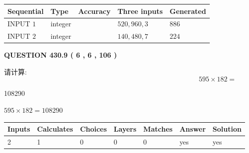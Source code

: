 \documentclass{ctexart}
\begin{document}
   
  
  
\noindent\begin{tabular}{|l|l|l|l|l|}
\hline
 Sequential & Type & Accuracy & Three inputs & Generated \\ 
\hline
 
 
  INPUT $  1 $ & integer &  & $
 520
 , 
 960
 , 
 3
 $ & $ 886 $ 
 \\  \hline  
 
 
  INPUT $  2 $ & integer &  & $
 140
 , 
 480
 , 
 7
 $ & $ 224 $ 
 \\  \hline  
 \end{tabular}
   
   
  
\vspace{0.2in}
  
{\textbf{\Large{QUESTION
430.9 
 ( 6 , 6 , 106 )
}}}
  
  
 
请计算:
\begin{equation}
595  \times    %
182 = \nonumber
\end{equation}
 
 
 
\noindent{}
 
 

108290
 
 
\noindent{}
 
 

 
 
 
\noindent{}
 
 

$ %
595 \times  %
182=   %
108290$
 
 
\noindent{}
 
 

 
   
   
   
   
\noindent\begin{tabular}{|l|l|l|l|l|l|l|}
 \hline
Inputs & Calculates & Choices & Layers & Matches & Answer & Solution \\ \hline
 2  & 
 1  & 
 0
  & 
 0  & 
 0  & 
  yes & 
  yes 
  \\ \hline
 \end{tabular}
   
\end{document}
